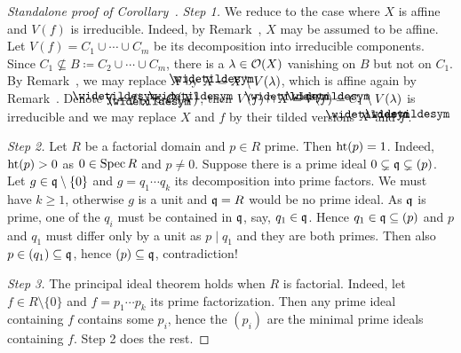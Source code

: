 \documentclass[a4paper,parskip=half,numbers=enddot, DIV=12, headheight=30pt]{scrreprt}
\begin{document}
\begin{proof}[Standalone proof of Corollary~]
	\emph{Step 1.} We reduce to the case where $X$ is affine and $V(f)$ is irreducible. Indeed, by Remark~, $X$ may be assumed to be affine. Let $V(f)=C_1\cup\cdots\cup C_m$ be its decomposition into irreducible components. Since $C_1\not\subseteq B\coloneqq C_2\cup\cdots\cup C_m$, there is a $\lambda\in\mathcal{O}(X)$ vanishing on $B$ but not on $C_1$. By Remark~, we may replace $X$ by $\snake X=X\setminus V(\lambda)$, which is affine again by Remark~. Denote $\snake f=f|_{\snake X}\in\Oo\big(\snake X\big)$, then $V(f)\cap \snake X=V(\snake f)=C_1\setminus V(\lambda)$ is irreducible and we may replace $X$ and $f$ by their tilded versions $\snake X$ and $\snake f$.
	
	\emph{Step 2.} Let $R$ be a factorial domain and $p\in R$ prime. Then $\operatorname{ht}(p)=1$. Indeed, $\operatorname{ht}(p)>0$ as $0\in\operatorname{Spec} R$ and $p\not=0$. Suppose there is a prime ideal $0\subsetneq\mathfrak{q}\subsetneq(p)$. Let $g\in\mathfrak{q}\setminus\{0\}$ and $g=q_1\cdots q_k$ its decomposition into prime factors. We must have $k\geq 1$, otherwise $g$ is a unit and $\mathfrak{q}=R$ would be no prime ideal. As $\mathfrak{q}$ is prime, one of the $q_i$ must be contained in $\mathfrak{q}$, say, $q_1\in\mathfrak{q}$. Hence $q_1\in \mathfrak{q}\subseteq(p)$ and $p$ and $q_1$ must differ only by a unit as $p\mid q_1$ and they are both primes. Then also $p\in (q_1)\subseteq\mathfrak{q}$, hence $(p)\subseteq\mathfrak{q}$, contradiction!
	
	\emph{Step 3.} The principal ideal theorem holds when $R$ is factorial. Indeed, let $f\in R\setminus\{0\}$ and $f=p_1\cdots p_k$ its prime factorization. Then any prime ideal containing $f$ contains some $p_i$, hence the $(p_i)$ are the minimal prime ideals containing $f$. Step 2 does the rest.
	

\end{proof}
\end{document}

